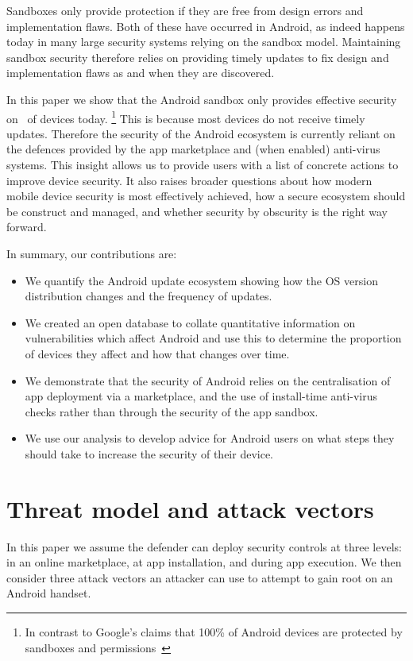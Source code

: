 \documentclass{llncs}
\begin{document}
Sandboxes only provide protection if they are free from design errors and implementation flaws. 
Both of these have occurred in Android, as indeed happens today in many large security systems relying on the sandbox model. 
Maintaining sandbox security therefore relies on providing timely updates to fix design and implementation flaws as and when they are discovered.

In this paper we show that the Android sandbox only provides effective security on \daMeanSecurityPercTwosfNominal\ of devices today.
\footnote{In contrast to Google's claims that 100\% of Android devices are protected by sandboxes and permissions~\cite{Patterson2013}}
This is because most devices do not receive timely updates. 
Therefore the security of the Android ecosystem is currently reliant on the defences provided by the app marketplace and (when enabled) anti-virus systems. 
This insight allows us to provide users with a list of concrete actions to improve device security. 
It also raises broader questions about how modern mobile device security is most effectively achieved, how a secure ecosystem should be construct and managed, and whether security by obscurity is the right way forward.

In summary, our contributions are:
\begin{itemize}
 \item We quantify the Android update ecosystem showing how the OS version distribution changes and the frequency of updates.
 \item We created an open database to collate quantitative information on vulnerabilities which affect Android and use this to determine the proportion of devices they affect and how that changes over time.
 \item We demonstrate that the security of Android relies on the centralisation of app deployment via a marketplace, and the use of install-time anti-virus checks rather than through the security of the app sandbox.
 \item We use our analysis to develop advice for Android users on what steps they should take to increase the security of their device.
 
\end{itemize}

\section{Threat model and attack vectors}
\label{sec:threatmodel}

In this paper we assume the defender can deploy security controls at three levels: in an online marketplace, at app installation, and during app execution.
We then consider three attack vectors an attacker can use to attempt to gain root on an Android handset.
\end{document}
